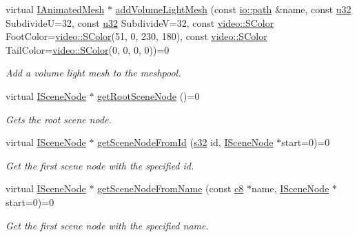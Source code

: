 \begin{DoxyCompactItemize}
virtual \hyperlink{classirr_1_1scene_1_1IAnimatedMesh}{I\+Animated\+Mesh} $\ast$ \hyperlink{classirr_1_1scene_1_1ISceneManager_a7086c554b86bdf055d6ebcc5950e1f16}{add\+Volume\+Light\+Mesh} (const \hyperlink{namespaceirr_1_1io_a6468281622ce3a1c46b72e19f32dded5}{io\+::path} \&name, const \hyperlink{namespaceirr_a0416a53257075833e7002efd0a18e804}{u32} SubdivideU=32, const \hyperlink{namespaceirr_a0416a53257075833e7002efd0a18e804}{u32} SubdivideV=32, const \hyperlink{classirr_1_1video_1_1SColor}{video\+::\+S\+Color} Foot\+Color=\hyperlink{classirr_1_1video_1_1SColor}{video\+::\+S\+Color}(51, 0, 230, 180), const \hyperlink{classirr_1_1video_1_1SColor}{video\+::\+S\+Color} Tail\+Color=\hyperlink{classirr_1_1video_1_1SColor}{video\+::\+S\+Color}(0, 0, 0, 0))=0
\begin{DoxyCompactList}\small\item\em Add a volume light mesh to the meshpool. \end{DoxyCompactList}\item 
virtual \hyperlink{classirr_1_1scene_1_1ISceneNode}{I\+Scene\+Node} $\ast$ \hyperlink{classirr_1_1scene_1_1ISceneManager_a4f7075320f1a3bf2838f29c23f78635f}{get\+Root\+Scene\+Node} ()=0
\begin{DoxyCompactList}\small\item\em Gets the root scene node. \end{DoxyCompactList}\item 
virtual \hyperlink{classirr_1_1scene_1_1ISceneNode}{I\+Scene\+Node} $\ast$ \hyperlink{classirr_1_1scene_1_1ISceneManager_a038e2afb1397fe8f2b6f8f6c55d52b55}{get\+Scene\+Node\+From\+Id} (\hyperlink{namespaceirr_ac66849b7a6ed16e30ebede579f9b47c6}{s32} id, \hyperlink{classirr_1_1scene_1_1ISceneNode}{I\+Scene\+Node} $\ast$start=0)=0
\begin{DoxyCompactList}\small\item\em Get the first scene node with the specified id. \end{DoxyCompactList}\item 
virtual \hyperlink{classirr_1_1scene_1_1ISceneNode}{I\+Scene\+Node} $\ast$ \hyperlink{classirr_1_1scene_1_1ISceneManager_a13ada3cca4b9eadee5e8ba3ccb6683da}{get\+Scene\+Node\+From\+Name} (const \hyperlink{namespaceirr_a9395eaea339bcb546b319e9c96bf7410}{c8} $\ast$name, \hyperlink{classirr_1_1scene_1_1ISceneNode}{I\+Scene\+Node} $\ast$start=0)=0
\begin{DoxyCompactList}\small\item\em Get the first scene node with the specified name. \end{DoxyCompactList}\item 

\end{DoxyCompactItemize}
